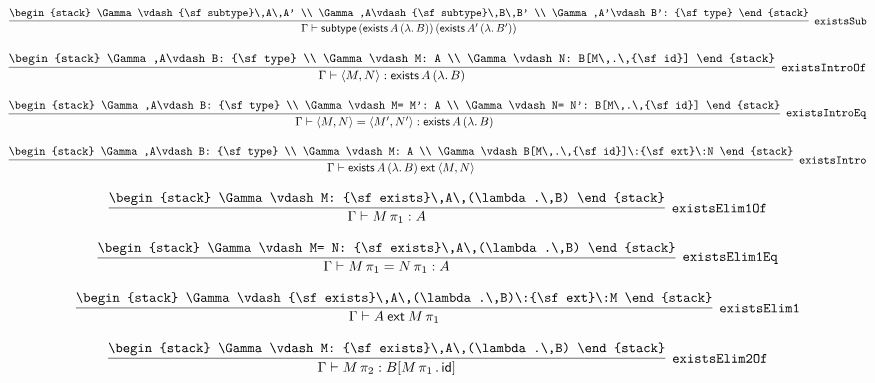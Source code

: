 \[
\infer[{\tt existsSub}]{\Gamma \vdash {\sf subtype}\,({\sf exists}\,A\,(\lambda .\,B))\,({\sf exists}\,A'\,(\lambda .\,B'))}{
\begin{stack}
\Gamma \vdash {\sf subtype}\,A\,A'
\\
\Gamma ,A\vdash {\sf subtype}\,B\,B'
\\
\Gamma ,A'\vdash B': {\sf type}
\end{stack}}
\]

\[
\infer[{\tt existsIntroOf}]{\Gamma \vdash \langle M,N\rangle : {\sf exists}\,A\,(\lambda .\,B)}{
\begin{stack}
\Gamma ,A\vdash B: {\sf type}
\\
\Gamma \vdash M: A
\\
\Gamma \vdash N: B[M\,.\,{\sf id}]
\end{stack}}
\]

\[
\infer[{\tt existsIntroEq}]{\Gamma \vdash \langle M,N\rangle = \langle M',N'\rangle : {\sf exists}\,A\,(\lambda .\,B)}{
\begin{stack}
\Gamma ,A\vdash B: {\sf type}
\\
\Gamma \vdash M= M': A
\\
\Gamma \vdash N= N': B[M\,.\,{\sf id}]
\end{stack}}
\]

\[
\infer[{\tt existsIntro}]{\Gamma \vdash {\sf exists}\,A\,(\lambda .\,B)\:{\sf ext}\:\langle M,N\rangle }{
\begin{stack}
\Gamma ,A\vdash B: {\sf type}
\\
\Gamma \vdash M: A
\\
\Gamma \vdash B[M\,.\,{\sf id}]\:{\sf ext}\:N
\end{stack}}
\]

\[
\infer[{\tt existsElim1Of}]{\Gamma \vdash M\, \pi_1: A}{
\begin{stack}
\Gamma \vdash M: {\sf exists}\,A\,(\lambda .\,B)
\end{stack}}
\]

\[
\infer[{\tt existsElim1Eq}]{\Gamma \vdash M\, \pi_1= N\, \pi_1: A}{
\begin{stack}
\Gamma \vdash M= N: {\sf exists}\,A\,(\lambda .\,B)
\end{stack}}
\]

\[
\infer[{\tt existsElim1}]{\Gamma \vdash A\:{\sf ext}\:M\, \pi_1}{
\begin{stack}
\Gamma \vdash {\sf exists}\,A\,(\lambda .\,B)\:{\sf ext}\:M
\end{stack}}
\]

\[
\infer[{\tt existsElim2Of}]{\Gamma \vdash M\, \pi_2: B[M\, \pi_1\,.\,{\sf id}]}{
\begin{stack}
\Gamma \vdash M: {\sf exists}\,A\,(\lambda .\,B)
\end{stack}}
\]

